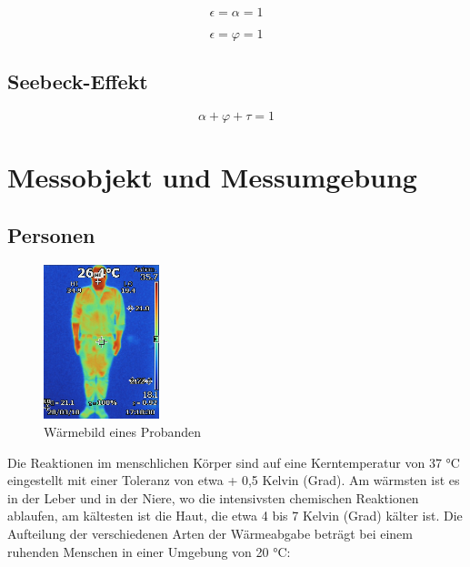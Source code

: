 \begin{equation}
\label{eq4}
\epsilon = \alpha  = 1
\end{equation}

\begin{equation}
\label{eq4}
\epsilon = \varphi  = 1
\end{equation}



\subsection{Seebeck-Effekt}

\begin{equation}
\label{eq4}
\alpha + \varphi + \tau  = 1
\end{equation}



\section{Messobjekt und Messumgebung}


\subsection{Personen}


\begin{figure}[H]
	\centering
	\includegraphics[width=0.3\textwidth]
	{fig/person_waerme.JPG}
	\caption[Wäermebild eines Probanden]{Wärmebild eines Probanden}
	\label{fig:Waermebild}
\end{figure}

Die Reaktionen im menschlichen Körper sind auf eine Kerntemperatur von 37 °C eingestellt
mit einer Toleranz von etwa + 0,5 Kelvin (Grad). Am wärmsten ist es in der Leber und in der
Niere, wo die intensivsten chemischen Reaktionen ablaufen, am kältesten ist die Haut, die
etwa 4 bis 7 Kelvin (Grad) kälter ist.
Die Aufteilung der verschiedenen Arten der Wärmeabgabe beträgt bei einem ruhenden
Menschen in einer Umgebung von 20 °C:

